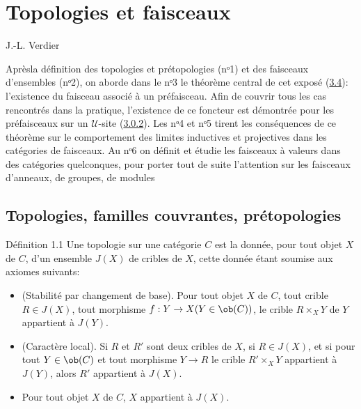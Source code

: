 \tableofcontents

\else
\chapter{Topologies et faisceaux}
\begin{center}
J.-L. Verdier
\end{center}
\fi

Après\pageoriginale la définition des topologies et
prétopologies (nᵒ1) et des faisceaux d'ensembles
(nᵒ2), on aborde dans le nᵒ3 le
théorème central de cet exposé (\hyperref[II.theo3.4]{3.4}): l'existence
du faisceau associé à un préfaisceau. Afin de couvrir tous les
cas rencontrés dans la pratique, l'existence de ce foncteur est
démontrée pour les préfaisceaux sur un $𝒰$-site
(\hyperref[II.def3.0.2]{3.0.2}). Les nᵒ4 et nᵒ5
tirent les conséquences de ce théorème sur le comportement des
limites inductives et projectives dans les catégories de
faisceaux. Au nᵒ6 on définit et étudie les
faisceaux à valeurs dans des catégories quelconques, pour porter
tout de suite l'attention sur les faisceaux d'anneaux, de groupes,
de modules \etcn

\section{Topologies, familles couvrantes,
  prétopologies}

\begin{enonce*}{Définition 1.1}
Une topologie sur une catégorie $C$ est la donnée, pour tout
objet $X$ de $C$, d'un ensemble $J(X)$ de cribles de $X$, cette
donnée étant soumise aux axiomes suivants:
\begin{itemize}
\item[T 1)] {\rm{(Stabilité par changement de base).}} Pour tout
  objet $X$ de $C$, tout crible $R\in J(X)$, tout morphisme
  $f:Y\rightarrow X(Y\in \ob (C))$, le crible $R\times_X Y$ de $Y$
  appartient à $J(Y)$.

\item[T 2)] {\rm(Caractère local).} Si $R$ et $R'$ sont deux
  cribles de $X$, si $R\in J(X)$, et si pour tout $Y\in \ob (C)$ et
  tout morphisme $Y\rightarrow R$ le crible $R'\times_X Y$
  appartient\pageoriginale
  à $J(Y)$, alors $R'$ appartient à $J(X)$.

\item[T 3)] Pour tout objet $X$ de $C$, $X$ appartient à $J(X)$.
\end{itemize}
\end{enonce*}

